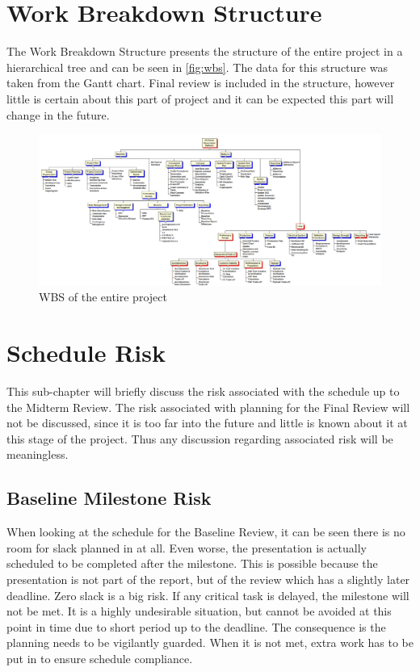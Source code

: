\documentclass[a4paper]{report}
\begin{document}
\section{Work Breakdown Structure}
The Work Breakdown Structure presents the structure of the entire project in a hierarchical tree and can be seen in \autoref{fig:wbs}. The data for this structure was taken from the Gantt chart. Final review is included in the structure, however little is certain about this part of project and it can be expected this part will change in the future.  

\begin{figure}[H]
	\centering
	
	\includegraphics[width=0.8\textheight, angle=270]{Figures/WBS.png}
	\caption{WBS of the entire project}
	\label{fig:wbs}
	
\end{figure}
\section{Schedule Risk}
This sub-chapter will briefly discuss the risk associated with the schedule up to the Midterm Review. The risk associated with planning for the Final Review will not be discussed, since it is too far into the future and little is known about it at this stage of the project. Thus any discussion regarding associated risk will be meaningless. 
\subsection{Baseline Milestone Risk}
When looking at the schedule for the Baseline Review, it can be seen there is no room for slack planned in at all. Even worse, the presentation is actually scheduled to be completed after the milestone. This is possible because the presentation is not part of the report, but of the review which has a slightly later deadline. 
\newline
Zero slack is a big risk. If any critical task is delayed, the milestone will not be met. It is a highly undesirable situation, but cannot be avoided at this point in time due to short period up to the deadline. The consequence is the planning needs to be vigilantly guarded. When it is not met, extra work has to be put in to ensure schedule compliance.
\end{document}
